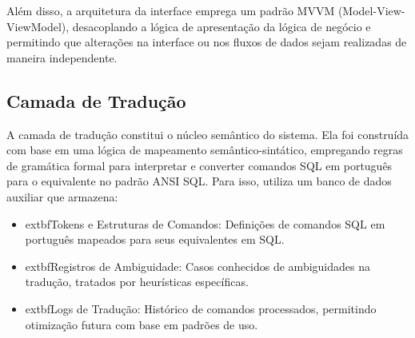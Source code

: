
Além disso, a arquitetura da interface emprega um padrão MVVM (Model-View-ViewModel), desacoplando a lógica de apresentação da lógica de negócio e permitindo que alterações na interface ou nos fluxos de dados sejam realizadas de maneira independente.

\subsection{Camada de Tradução}
A camada de tradução constitui o núcleo semântico do sistema. Ela foi construída com base em uma lógica de mapeamento semântico-sintático, empregando regras de gramática formal para interpretar e converter comandos SQL em português para o equivalente no padrão ANSI SQL. Para isso, utiliza um banco de dados auxiliar que armazena:

\begin{itemize}
    \item 	extbf{Tokens e Estruturas de Comandos}: Definições de comandos SQL em português mapeados para seus equivalentes em SQL.
    \item 	extbf{Registros de Ambiguidade}: Casos conhecidos de ambiguidades na tradução, tratados por heurísticas específicas.
    \item 	extbf{Logs de Tradução}: Histórico de comandos processados, permitindo otimização futura com base em padrões de uso.
\end{itemize}

